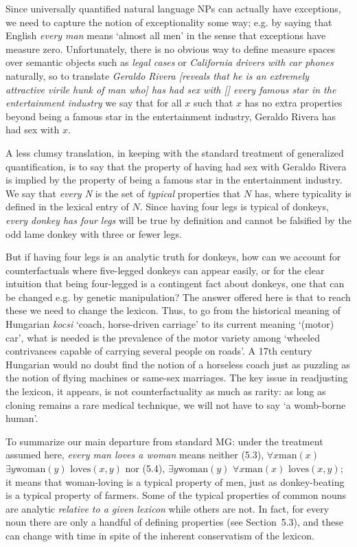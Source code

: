 Since universally quantified natural language NPs can actually have
exceptions, we need to capture the notion of exceptionality some way; e.g. by
saying that English {\it every man} means `almost all men' in the sense that
exceptions have measure zero. Unfortunately, there is no obvious way to define
measure spaces over semantic objects such as {\it legal cases} or {\it California
drivers with car phones} naturally, so to translate {\it Geraldo Rivera
[reveals that he is an extremely attractive virile hunk of man who] has had
sex with [] every famous star in the entertainment industry} we say that
for all $x$ such that $x$ has no extra properties beyond being a famous star
in the entertainment industry, Geraldo Rivera has had sex with $x$. 

A less clumsy translation, in keeping with the standard treatment of
generalized quantification, is to say that the property of having had sex with
Geraldo Rivera is implied by the property of being a famous star in the
entertainment industry. We say that {\it every N} is the set of {\it typical}
properties that $N$ has, where typicality is defined in the lexical entry of
$N$. Since having four legs is typical of donkeys, {\it every donkey has four
legs} will be true by definition and cannot be falsified by the odd lame
donkey with three or fewer legs. 

But if having four legs is an analytic truth for
donkeys, how can we account for counterfactuals where five-legged donkeys can
appear easily, or for the clear intuition that being four-legged is a
contingent fact about donkeys, one that can be changed e.g. by genetic
manipulation?  The answer offered here is that to reach these we need to
change the lexicon.  Thus, to go from the historical meaning of Hungarian {\it
  kocsi} `coach, horse-driven carriage' to its current meaning `(motor) car',
what is needed is the prevalence of the motor variety among `wheeled
contrivances capable of carrying several people on roads'. A 17th century
Hungarian would no doubt find the notion of a horseless coach just as puzzling
as the notion of flying machines or same-sex marriages. The key issue in
readjusting the lexicon, it appears, is not counterfactuality as much as
rarity: as long as cloning remains a rare medical technique, we will not have
to say `a womb-borne human'.

To summarize our main departure from standard MG: under the treatment assumed
here, {\it every man loves a woman} means neither (5.3), $\forall x
\text{man}(x)$ $ \exists y \text{woman}(y)$ $\text{loves}(x,y)$ nor (5.4),
$\exists y \text{woman}(y)$ $ \forall x \text{man}(x)$ $\text{loves}(x,y)$; it
means that woman-loving is a typical property of men, just as donkey-beating
is a typical property of farmers.  Some of the typical properties of common
nouns are analytic {\it relative to a given lexicon} while others are not. In
fact, for every noun there are only a handful of defining properties (see
Section~5.3), and these can change with time in spite of the inherent
conservatism of the lexicon.


